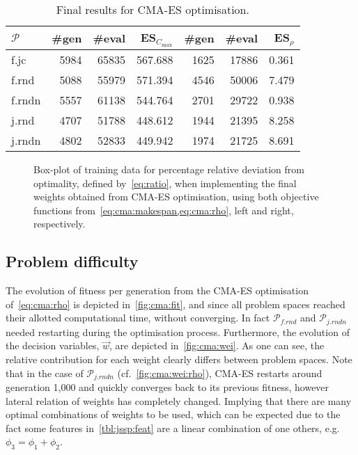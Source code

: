 \documentclass{acm_proc_article-sp}
\begin{document}
\begin{table}\centering
\caption{Final results for CMA-ES optimisation.}\label{cma:funeval}
\begin{tabular}{|l|rrr|rrr|}\hline
$\mathcal{P}$ & \#gen & \#eval & ES$_{C_{\max}}$ & \#gen & \#eval & ES$_\rho$ \\
\hline\hline
f.jc & 5984 & 65835 & 567.688  & 1625 & 17886 & 0.361 \\
f.rnd & 5088 & 55979 & 571.394 & 4546 & 50006 & 7.479 \\
f.rndn & 5557 & 61138 & 544.764 & 2701 & 29722 & 0.938 \\
j.rnd & 4707 & 51788 & 448.612 & 1944 & 21395 & 8.258 \\
j.rndn & 4802 & 52833 & 449.942 & 1974 & 21725 & 8.691 \\
\hline
\end{tabular}
\end{table}

\begin{figure}
\caption{Box-plot of training data for percentage relative deviation from optimality, defined by~\cref{eq:ratio}, when implementing the final weights obtained from CMA-ES optimisation, using both objective functions from~\cref{eq:cma:makespan,eq:cma:rho}, left and right, respectively.}\label{fig:cma:trainboxpl}
\end{figure}

\subsection{Problem difficulty}\label{sec:expr:data}
The evolution of fitness per generation from the CMA-ES optimisation of~\cref{eq:cma:rho} is depicted in~\cref{fig:cma:fit}, and since all problem spaces reached their allotted computational time, without converging. In fact $\mathcal{P}_{f.rnd}$ and $\mathcal{P}_{j.rndn}$ needed restarting during the optimisation process. 
Furthermore, the  evolution of the decision variables, $\vec{w}$, are depicted in~\cref{fig:cma:wei}. As one can see, the relative contribution for each weight clearly differs between problem spaces. Note that in the case of $\mathcal{P}_{j.rndn}$ (cf.~\cref{fig:cma:wei:rho}), CMA-ES restarts around generation 1,000 and quickly converges back to its previous fitness, however lateral relation of weights has completely changed. Implying that there are many optimal combinations of weights to be used, which can be expected due  to the fact some features in~\cref{tbl:jssp:feat} are a linear combination of one others, e.g. $\phi_3=\phi_1+\phi_2$.
\end{document}
